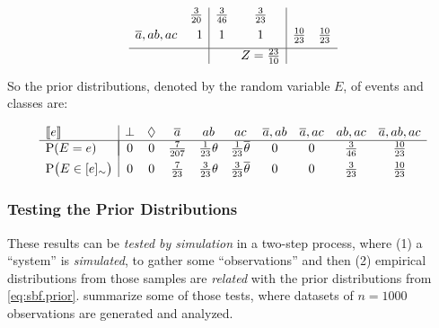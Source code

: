 \documentclass{llncs}
\newcommand{\at}[1]{\ensuremath{\!\del{#1}}}
\newcommand{\co}[1]{\ensuremath{\overline{#1}}}
\newcommand{\stablecore}[1]{\ensuremath{\left\llbracket #1 \right\rrbracket}}
\newcommand{\pr}[1]{\ensuremath{\mathrm{P}\at{#1}}}
\newcommand{\class}[1]{\ensuremath{[{#1}]_{\sim}}}
\newcommand{\inconsistent}{\bot}
\newcommand{\indepclass}{\ensuremath{\Diamond}}
\begin{document}
\begin{description}
\begin{equation*}
\begin{array}{lr|cc|cc}
                   & \frac{3}{20}
                   & \frac{3}{46}
                   & \frac{3}{23}
                  \\[4pt]
                  \co{a}, ab, ac
                   & 1
                   & 1
                   & 1
                   & \frac{10}{23}
                   & \frac{10}{23}
                  \\[4pt]
                  \hline
                   &
                   &
                   & Z = \frac{23}{10}
                   &
              \end{array}
          \end{equation*}
\end{description}

So the prior distributions, denoted by the random variable $E$, of events and classes are:

\begin{equation}
    \begin{array}{l|ccccccccc}
        \stablecore{e}          &
        \inconsistent           &
        \indepclass             &
        \co{a}                  &
        ab                      &
        ac                      &
        \co{a}, ab              &
        \co{a}, ac              &
        ab, ac                  &
        \co{a}, ab, ac
        \\ \hline\\[-12pt]

        \pr{E = e}              &
        0                       &
        0                       &
        \frac{7}{207}           &
        \frac{1}{23}\theta      &
        \frac{1}{23}\co{\theta} &
        0                       &
        0                       &
        \frac{3}{46}            &
        \frac{10}{23}
        \\[4pt]

        \pr{E \in \class{e}}    &
        0                       &
        0                       &
        \frac{7}{23}            &
        \frac{3}{23}\theta      &
        \frac{3}{23}\co{\theta} &
        0                       &
        0                       &
        \frac{3}{23}            &
        \frac{10}{23}
    \end{array}\label{eq:sbf.prior}
\end{equation}
%
%
%
\subsubsection*{Testing the Prior Distributions}
%
%
%
These results can be \emph{tested by simulation} in a two-step process, where (1) a ``system'' is \emph{simulated}, to gather some ``observations'' and then (2) empirical distributions from those samples are \emph{related} with the prior distributions from \cref{eq:sbf.prior}.  summarize some of those tests, where datasets of $n = 1000$ observations are generated and analyzed.
\end{document}

